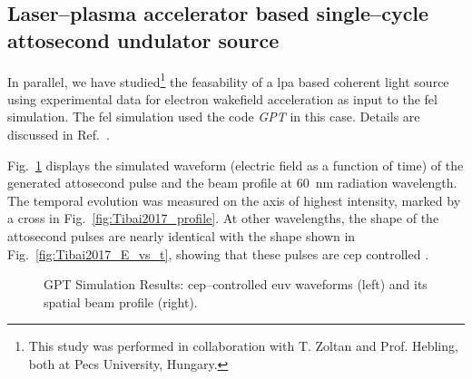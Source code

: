 \subsection{Laser--plasma accelerator based single--cycle attosecond undulator source}
In parallel, we have studied\footnote{This study was performed in collaboration
with T. Zoltan and Prof. Hebling, both at Pecs University, Hungary.} the feasability of a \gls{lpa} based coherent light
source using experimental data for electron wakefield acceleration as input to
the \gls{fel} simulation. The \gls{fel} simulation used the code \textit{GPT} in this case.
Details are discussed in Ref.~\cite{Tibai2017}.

Fig.~\ref{fig:Tibai2017} displays the simulated waveform (electric field as
a function of time)  of the generated attosecond
pulse and the beam profile at \SI{60}{\nano\metre} radiation wavelength. The
temporal evolution was measured on the axis of highest intensity, marked by  a
cross in Fig.~\ref{fig:Tibai2017_profile}. At other wavelengths, the shape of the attosecond pulses are nearly identical with the
shape shown in Fig.~\ref{fig:Tibai2017_E_vs_t}, showing that these pulses are
\gls{cep} controlled \cite{Tibai2017}.
%
\begin{figure}[ht]
  \caption{GPT Simulation Results: \gls{cep}--controlled \gls{euv} waveforms (left) and its spatial beam
    profile (right).}
    \label{fig:Tibai2017}
\end{figure}

